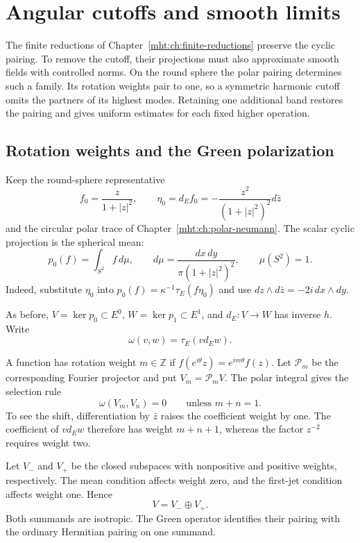\chapter{Angular cutoffs and smooth limits}
\label{mht:ch:angular-cutoffs}

The finite reductions of Chapter~\ref{mht:ch:finite-reductions}
preserve the cyclic pairing. To remove the cutoff, their projections
must also approximate smooth fields with controlled norms. On the
round sphere the polar pairing determines such a family. Its rotation
weights pair to one, so a symmetric harmonic cutoff omits the partners
of its highest modes. Retaining one additional band restores the
pairing and gives uniform estimates for each fixed higher operation.

\section{Rotation weights and the Green polarization}

Keep the round-sphere representative
\[
 f_0=\frac{z}{1+|z|^2},\qquad
 \eta_0=d_Ef_0=-\frac{z^2}{(1+|z|^2)^2}d\bar z
\]
and the circular polar trace of
Chapter~\ref{mht:ch:polar-neumann}. The scalar cyclic projection is
the spherical mean:
\begin{equation}\label{mht:eq:angular-mean}
 p_0(f)=\int_{S^2}f\,d\mu,
 \qquad d\mu=\frac{dx\,dy}{\pi(1+|z|^2)^2},
 \qquad \mu(S^2)=1.
\end{equation}
Indeed, substitute $\eta_0$ into
$p_0(f)=\kappa^{-1}\tau_E(f\eta_0)$ and use
$dz\wedge d\bar z=-2i\,dx\wedge dy$.

As before, $V=\ker p_0\subset E^0$, $W=\ker p_1\subset E^1$,
and $d_E:V\to W$ has inverse $h$. Write
\[
 \omega(v,w)=\tau_E(vd_Ew).
\]

A function has rotation weight $m\in\mathbb Z$ if
$f(e^{i\theta}z)=e^{im\theta}f(z)$. Let $\mathcal P_m$ be the
corresponding Fourier projector and put $V_m=\mathcal P_mV$.
The polar integral gives the selection rule
\begin{equation}\label{mht:eq:angular-weight-pairing}
 \omega(V_m,V_n)=0\qquad\text{unless }m+n=1.
\end{equation}
To see the shift, differentiation by $\bar z$ raises the coefficient
weight by one. The coefficient of $vd_Ew$ therefore has weight
$m+n+1$, whereas the factor $z^{-2}$ requires weight two.

Let $V_-$ and $V_+$ be the closed subspaces with nonpositive and
positive weights, respectively. The mean condition affects weight
zero, and the first-jet condition affects weight one. Hence
\[
 V=V_-\oplus V_+.
\]
Both summands are isotropic. The Green operator identifies their
pairing with the ordinary Hermitian pairing on one summand.

